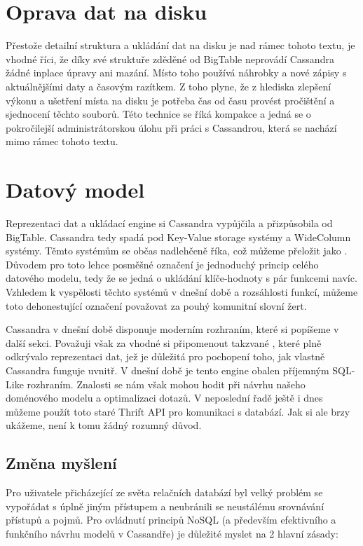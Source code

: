 \section{Oprava dat na disku}
Přestože detailní struktura a ukládání dat na disku je nad rámec tohoto textu, je vhodné říci, že díky své struktuře zděděné od BigTable neprovádí Cassandra žádné inplace úpravy ani mazání. Místo toho používá náhrobky a nové zápisy s aktuálnějšími daty a časovým razítkem. Z toho plyne, že z hlediska zlepšení výkonu a ušetření místa na disku je potřeba čas od času provést pročištění a sjednocení těchto  souborů. Této technice se říká kompakce a jedná se o pokročilejší administrátorskou úlohu při práci s Cassandrou, která se nachází mimo rámec tohoto textu.

\section{Datový model}
Reprezentaci dat a ukládací engine si Cassandra vypůjčila a přizpůsobila od BigTable. Cassandra tedy spadá pod Key-Value storage systémy a WideColumn systémy. Těmto systémům se občas nadlehčeně říka, což můžeme přeložit jako . Důvodem pro toto lehce posměšné označení je jednoduchý princip celého datového modelu, tedy že se jedná  o ukládání klíče-hodnoty s pár funkcemi navíc. Vzhledem k vyspělosti těchto systémů v dnešní době a rozsáhlosti funkcí, můžeme toto dehonestující označení považovat za pouhý komunitní slovní žert.

Cassandra v dnešní době disponuje moderním rozhraním, které si popíšeme v další sekci. Považuji však za vhodné si připomenout takzvané , které plně odkrývalo reprezentaci dat, jež je důležitá pro pochopení toho, jak vlastně Cassandra funguje uvnitř. V dnešní době je tento engine obalen příjemným SQL-Like rozhraním. Znalosti  se nám však mohou hodit při návrhu našeho doménového modelu a optimalizaci dotazů. V neposlední řadě ještě i dnes můžeme použít toto staré Thrift API pro komunikaci s databází. Jak si ale brzy ukážeme, není k tomu žádný rozumný důvod. 

\subsection{Změna myšlení}
Pro uživatele přicházející ze světa relačních databází byl velký problém se vypořádat s úplně jiným přístupem a neubránili se neustálému srovnávání přístupů a pojmů. Pro ovládnutí principů NoSQL (a především efektivního a funkčního návrhu modelů v Cassandře) je důležité myslet na 2 hlavní zásady: 

